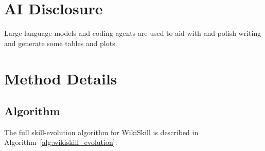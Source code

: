 \documentclass[11pt, a4paper, copyright, gr]{google}
\newcommand{\method}{WikiSkill\xspace}
\begin{document}
\vspace{-5pt}
\section*{AI Disclosure}

Large language models and coding agents are used to aid with and polish writing and generate some tables and plots.




\clearpage
\newpage
\appendix

\section{Method Details} \label{sec:method_detail}

\subsection{Algorithm}

The full skill-evolution algorithm for \method is described in Algorithm~\ref{alg:wikiskill_evolution}.
\end{document}
